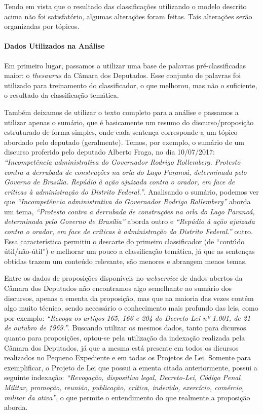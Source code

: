 Tendo em vista que o resultado das classificações utilizando o modelo descrito acima não foi satisfatório, algumas alterações foram feitas. Tais alterações serão organizadas por tópicos.

\paragraph{Dados Utilizados na Análise}

Em primeiro lugar, passamos a utilizar uma base de palavras pré-classificadas maior: o \textit{thesaurus} da Câmara dos Deputados. Esse conjunto de palavras foi utilizado para treinamento do classificador, o que melhorou, mas não o suficiente, o resultado da classificação temática.

Também deixamos de utilizar o texto completo para a análise e passamos a utilizar apenas o sumário, que é basicamente um resumo do discurso/proposição estruturado de forma simples, onde cada sentença corresponde a um tópico abordado pelo deputado (geralmente). Temos, por exemplo, o sumário de um discurso proferido pelo deputado Alberto Fraga, no dia 10/07/2017: \textit{``Incompetência administrativa do Governador Rodrigo Rollemberg. Protesto contra a derrubada de construções na orla do Lago Paranoá, determinada pelo Governo de Brasília. Repúdio à ação ajuizada contra o orador, em face de críticas à administração do Distrito Federal.''}. Analisando o sumário, podemos ver que \textit{``Incompetência administrativa do Governador Rodrigo Rollemberg''} aborda um tema, \textit{``Protesto contra a derrubada de construções na orla do Lago Paranoá, determinada pelo Governo de Brasília''} aborda outro e \textit{``Repúdio à ação ajuizada contra o orador, em face de críticas à administração do Distrito Federal.''} outro. Essa característica permitiu o descarte do primeiro classificador (de ``contúdo útil/não-útil'') e melhorar um pouco a classificação temática, já que as sentenças obtidas trazem um conteúdo relevante, são menores e abrangem menos temas.

Entre os dados de proposições disponíveis no \textit{webservice} de dados abertos da Câmara dos Deputados não encontramos algo semelhante ao sumário dos discursos, apenas a ementa da proposição, mas que na maioria das vezes contém algo muito técnico, sendo necessário o conhecimento mais profundo das leis, como por exemplo: \textit{``Revoga os artigos 165, 166 e 204 do Decreto-Lei nº 1.001, de 21 de outubro de 1969.''}. Buscando utilizar os mesmos dados, tanto para dicursos quanto para proposições, optou-se pela utilização da indexação realizada pela Câmara dos Deputados, já que a mesma está presente em todos os dicursos realizados no Pequeno Expediente e em todas os Projetos de Lei. Somente para exemplificar, o Projeto de Lei que possui a ementa citada anteriormente, possui a seguinte indexação: \textit{``Revogação, dispositivo legal, Decreto-Lei, Código Penal Militar, promoção, reunião, publicação, crítica, indevido, exercício, comércio, militar da ativa''}, o que permite o entendimento do que realmente a proposição aborda.

